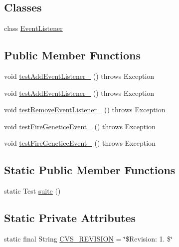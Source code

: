 \subsection*{Classes}
\begin{DoxyCompactItemize}
\item 
class \hyperlink{classorg_1_1jgap_1_1event_1_1_event_manager_test_1_1_event_listener}{Event\-Listener}
\end{DoxyCompactItemize}
\subsection*{Public Member Functions}
\begin{DoxyCompactItemize}
\item 
void \hyperlink{classorg_1_1jgap_1_1event_1_1_event_manager_test_a71dc8bbad375212efefb5ba2b739e7d2}{test\-Add\-Event\-Listener\-\_} ()  throws Exception 
\item 
void \hyperlink{classorg_1_1jgap_1_1event_1_1_event_manager_test_a42f7bc88112d5e5c5b64401afafcabe4}{test\-Add\-Event\-Listener\-\_} ()  throws Exception 
\item 
void \hyperlink{classorg_1_1jgap_1_1event_1_1_event_manager_test_a5111644d04877323b723bc31d9ad3338}{test\-Remove\-Event\-Listener\-\_} ()  throws Exception 
\item 
void \hyperlink{classorg_1_1jgap_1_1event_1_1_event_manager_test_a7f850c408b70fb869a909f18782fdb47}{test\-Fire\-Genetice\-Event\-\_} ()  throws Exception 
\item 
void \hyperlink{classorg_1_1jgap_1_1event_1_1_event_manager_test_a4e6e727d3dc75d9a9cc4379cc6fb6594}{test\-Fire\-Genetice\-Event\-\_} ()  throws Exception 
\end{DoxyCompactItemize}
\subsection*{Static Public Member Functions}
\begin{DoxyCompactItemize}
\item 
static Test \hyperlink{classorg_1_1jgap_1_1event_1_1_event_manager_test_aaa6a0abe8e695e267af354f09081126d}{suite} ()
\end{DoxyCompactItemize}
\subsection*{Static Private Attributes}
\begin{DoxyCompactItemize}
\item 
static final String \hyperlink{classorg_1_1jgap_1_1event_1_1_event_manager_test_a78aa41417574f49b0c43044c352cf94c}{C\-V\-S\-\_\-\-R\-E\-V\-I\-S\-I\-O\-N} = \char`\"{}\$Revision\-: 1. \$\char`\"{}
\end{DoxyCompactItemize}
